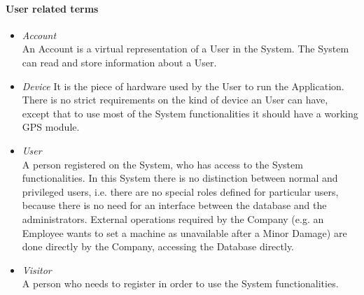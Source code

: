 \paragraph{User related terms}
	\begin{itemize}
		\item \emph{Account} \\
		An Account is a virtual representation of a User in the System. The System can read and store information about a User.
	
		\item \emph{Device}
		It is the piece of hardware used by the User to run the Application. There is no strict requirements on the kind of device an User can have, except that to use most of the System functionalities it should have a working GPS module.
			
		\item \emph{User}\\
		A person registered on the System, who has access to the System functionalities. 
		In this System there is no distinction between normal and privileged users, i.e. there are no special roles defined for particular users, because there is no need for an interface between the database and the administrators. 
		External operations required by the Company (e.g. an Employee wants to set a machine as unavailable after a Minor Damage) are done directly by the Company, accessing the Database directly.
	
		\item \emph{Visitor}\\
		A person who needs to register in order to use the System functionalities.
	\end{itemize}
	
